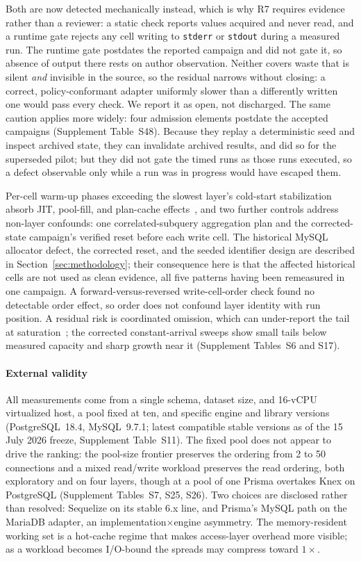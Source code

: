 Both are now detected mechanically instead, which is why R7 requires evidence rather than a reviewer:
a static check reports values acquired and never read, and a runtime gate rejects any cell writing to
\texttt{stderr} or \texttt{stdout} during a measured run.
The runtime gate postdates the reported campaign and did not gate it, so absence of output there
rests on author observation.
Neither covers waste that is silent \emph{and} invisible in the source, so the residual narrows
without closing: a correct, policy-conformant adapter uniformly slower than a differently written one
would pass every check.
We report it as open, not discharged.
The same caution applies more widely: four admission elements postdate the accepted campaigns
(Supplement Table~S48).
Because they replay a deterministic seed and inspect archived state, they can invalidate archived
results, and did so for the superseded pilot; but they did not gate the timed runs as those runs
executed, so a defect observable only while a run was in progress would have escaped them.

Per-cell warm-up phases exceeding the slowest layer's cold-start stabilization absorb JIT, pool-fill,
and plan-cache effects~\cite{mytkowicz2009producing}, and two further controls address non-layer
confounds: one correlated-subquery aggregation plan and the corrected-state campaign's verified reset
before each write cell.
The historical MySQL allocator defect, the corrected reset, and the seeded identifier design are
described in Section~\ref{sec:methodology}; their consequence here is that the affected historical
cells are not used as clean evidence, all five patterns having been remeasured in one campaign.
A forward-versus-reversed write-cell-order check found no detectable order effect, so order does not
confound layer identity with run position.
A residual risk is coordinated omission, which can under-report the tail at
saturation~\cite{fruth2022tail,tene2015latency}; the corrected constant-arrival sweeps show small
tails below measured capacity and sharp growth near it (Supplement Tables~S6 and S17).

\paragraph{External validity}
All measurements come from a single schema, dataset size, and 16-vCPU virtualized host, a pool fixed
at ten, and specific engine and library versions (PostgreSQL~18.4, MySQL~9.7.1; latest compatible
stable versions as of the 15 July 2026 freeze, Supplement Table~S11).
The fixed pool does not appear to drive the ranking: the pool-size frontier preserves the ordering
from 2 to 50 connections and a mixed read/write workload preserves the read ordering, both
exploratory and on four layers, though at a pool of one Prisma overtakes Knex on PostgreSQL
(Supplement Tables~S7, S25, S26).
Two choices are disclosed rather than resolved: Sequelize on its stable 6.x line, and Prisma's MySQL
path on the MariaDB adapter, an implementation$\times$engine asymmetry.
The memory-resident working set is a hot-cache regime that makes access-layer overhead more visible;
as a workload becomes I/O-bound the spreads may compress toward $1\times$.

